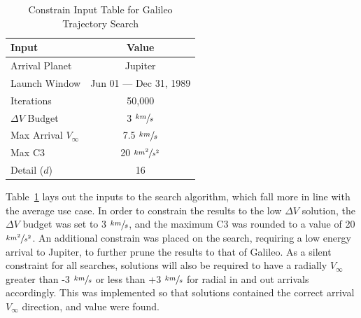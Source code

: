 \documentclass[letterpaper, preprint, paper,11pt]{AAS}	%
\begin{document}
\begin{table}[htb]
    \centering
    \caption{Constrain Input Table for Galileo Trajectory Search}
    \label{table:galiInputs}
    \begin{tabular}{lc}
        \toprule
        \textbf{Input} & \textbf{Value}\\
        \midrule
        Arrival Planet & Jupiter \\
        Launch Window & Jun 01 --- Dec 31, 1989 \\
        Iterations & 50,000 \\
        $\Delta V$ Budget & 3 $\sfrac{km}{s}$ \\
        Max Arrival $V_{\infty}$ & 7.5 $\sfrac{km}{s}$  \\
        Max C3 & 20 $\sfrac{km^2}{s^2}$ \\
        Detail ($d$) & 16 \\
        \bottomrule
    \end{tabular}
\end{table}

Table~\ref*{table:galiInputs} lays out the inputs to the search algorithm, which fall more in line with the average use case. In order to constrain the results to the low $\Delta V$ solution, the $\Delta V$ budget was set to 3 $\sfrac{km}{s}$, and the maximum C3 was rounded to a value of 20 $\sfrac{km^2}{s^2}$. An additional constrain was placed on the search, requiring a low energy arrival to Jupiter, to further prune the results to that of Galileo. As a silent constraint for all searches, solutions will also be required to have a radially $V_\infty$ greater than -3 $\sfrac{km}{s}$ or less than +3 $\sfrac{km}{s}$ for radial in and out arrivals accordingly. This was implemented so that solutions contained the correct arrival $V_\infty$ direction, and value were found.
\end{document}

